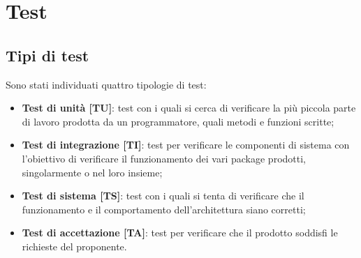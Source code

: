 \newpage
\section{Test}
	\subsection{Tipi di test}
	Sono stati individuati quattro tipologie di test:
	\begin{itemize}
		\item \textbf{Test di unità [TU]}: test con i quali si cerca di verificare la più piccola parte di lavoro prodotta da un programmatore, quali metodi e funzioni scritte;
		\item \textbf{Test di integrazione [TI]}: test per verificare le componenti di sistema con l'obiettivo di verificare il funzionamento dei vari package prodotti, singolarmente o nel loro insieme;
		\item \textbf{Test di sistema [TS]}: test con i quali si tenta di verificare che il funzionamento e il comportamento dell'architettura siano corretti;
		\item \textbf{Test di accettazione [TA]}: test per verificare che il prodotto soddisfi le richieste del proponente.
	\end{itemize}


